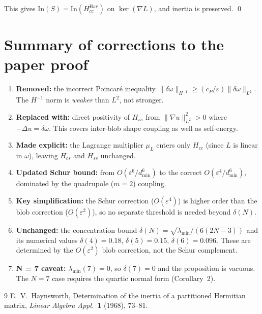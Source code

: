 \documentclass[11pt]{article}
\begin{document}
This gives $\mathrm{In}(S) = \mathrm{In}(H_{cc}^{\mathrm{Hav}})$
on $\ker(\nabla L)$, and inertia is preserved.  \qed

\section{Summary of corrections to the paper proof}

\begin{enumerate}
  \item \textbf{Removed:} the incorrect Poincar\'e inequality
    $\|\delta\omega\|_{H^{-1}} \ge (c_P/\varepsilon)\|\delta\omega\|_{L^2}$.
    The $H^{-1}$ norm is \emph{weaker} than $L^2$, not stronger.

  \item \textbf{Replaced with:} direct positivity of $H_{ss}$
    from $\|\nabla u\|_{L^2}^2 > 0$ where $-\Delta u = \delta\omega$.
    This covers inter-blob shape coupling as well as self-energy.

  \item \textbf{Made explicit:} the Lagrange multiplier $\mu_L$
    enters only $H_{cc}$ (since $L$ is linear in $\omega$),
    leaving $H_{cs}$ and $H_{ss}$ unchanged.

  \item \textbf{Updated Schur bound:} from $O(\varepsilon^6/d_{\min}^6)$
    to the correct $O(\varepsilon^4/d_{\min}^6)$, dominated by the
    quadrupole ($m = 2$) coupling.

  \item \textbf{Key simplification:} the Schur correction ($O(\varepsilon^4)$)
    is higher order than the blob correction ($O(\varepsilon^2)$),
    so no separate threshold is needed beyond $\delta(N)$.

  \item \textbf{Unchanged:} the concentration bound
    $\delta(N) = \sqrt{\lambda_{\min}/(6(2N{-}3))}$ and its numerical
    values $\delta(4) = 0.18$, $\delta(5) = 0.15$, $\delta(6) = 0.096$.
    These are determined by the $O(\varepsilon^2)$ blob correction, not
    the Schur complement.

  \item \textbf{N = 7 caveat:} $\lambda_{\min}(7) = 0$, so
    $\delta(7) = 0$ and the proposition is vacuous.  The $N = 7$
    case requires the quartic normal form (Corollary~2).
\end{enumerate}

\begin{thebibliography}{9}
E.~V.~Haynsworth, Determination of the inertia of a partitioned Hermitian matrix,
\emph{Linear Algebra Appl.}\ \textbf{1} (1968), 73--81.
\end{thebibliography}
\end{document}
